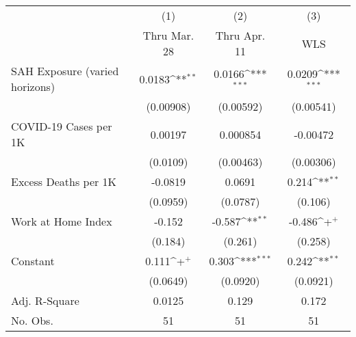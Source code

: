 {
\def\sym#1{\ifmmode^{#1}\else\(^{#1}\)\fi}
\begin{tabular}{l*{3}{c}}
\hline\hline
            &\multicolumn{1}{c}{(1)}         &\multicolumn{1}{c}{(2)}         &\multicolumn{1}{c}{(3)}         \\
            &Thru Mar. 28         &Thru Apr. 11         &         WLS         \\
\hline
SAH Exposure (varied horizons)&      0.0183\sym{**} &      0.0166\sym{***}&      0.0209\sym{***}\\
            &   (0.00908)         &   (0.00592)         &   (0.00541)         \\
COVID-19 Cases per 1K&     0.00197         &    0.000854         &    -0.00472         \\
            &    (0.0109)         &   (0.00463)         &   (0.00306)         \\
Excess Deaths per 1K&     -0.0819         &      0.0691         &       0.214\sym{**} \\
            &    (0.0959)         &    (0.0787)         &     (0.106)         \\
Work at Home Index&      -0.152         &      -0.587\sym{**} &      -0.486\sym{+}  \\
            &     (0.184)         &     (0.261)         &     (0.258)         \\
Constant    &       0.111\sym{+}  &       0.303\sym{***}&       0.242\sym{**} \\
            &    (0.0649)         &    (0.0920)         &    (0.0921)         \\
\hline
Adj. R-Square&      0.0125         &       0.129         &       0.172         \\
No. Obs.    &          51         &          51         &          51         \\
\hline\hline
\end{tabular}
}
